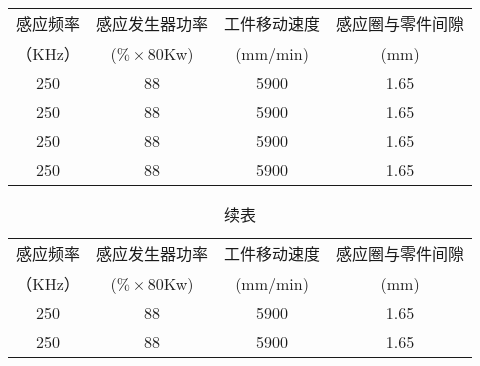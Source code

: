 \begin{table}[!htbp]
    \centering
    \begin{tabular}{|c| c|c|c|}
    \hline
    感应频率 &感应发生器功率 & 工件移动速度  &感应圈与零件间隙\\
    （KHz）&($\% \times$80Kw) &(mm/min)  &(mm)\\
    \hline
    250 &88 &5900 &1.65\\
    \hline
    250 &88 &5900 &1.65\\
    \hline
    250 &88 &5900 &1.65\\
    \hline
    250 &88 &5900 &1.65\\
    \hline
    \end{tabular}
\end{table}


\begin{table}
    \centering
    \captionsetup{singlelinecheck=off}
    \caption*{续表} %
    \begin{tabular}{|c| c|c|c|}
    \hline
    感应频率 &感应发生器功率 & 工件移动速度  &感应圈与零件间隙\\
    （KHz）&($\% \times$80Kw) &(mm/min)  &(mm)\\
    \hline
    250 &88 &5900 &1.65\\
    \hline
    250 &88 &5900 &1.65\\
    \hline
    \end{tabular}
\end{table}
